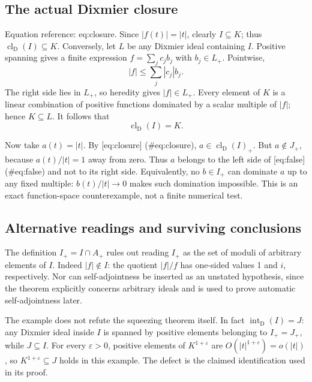 \documentclass[10pt]{article}
\begin{document}
\subsection*{The actual Dixmier closure}
Equation reference: eq:closure. Since \(|f(t)|=|t|\), clearly \(I\subseteq K\); thus \(\operatorname{cl}_{\mathrm D}(I)\subseteq K\). Conversely, let \(L\) be any Dixmier ideal containing \(I\). Positive spanning gives a finite expression \(f=\sum_j c_j b_j\) with \(b_j\in L_+\). Pointwise, \[|f|\leq\sum_j|c_j|b_j.\] The right side lies in \(L_+\), so heredity gives \(|f|\in L_+\). Every element of \(K\) is a linear combination of positive functions dominated by a scalar multiple of \(|f|\); hence \(K\subseteq L\). It follows that \[
 \operatorname{cl}_{\mathrm D}(I)=K.\]\par
Now take \(a(t)=|t|\). By [eq:closure] (\#eq:closure), \(a\in\operatorname{cl}_{\mathrm D}(I)_+\). But \(a\notin J_+\), because \(a(t)/|t|=1\) away from zero. Thus \(a\) belongs to the left side of [eq:false] (\#eq:false) and not to its right side. Equivalently, no \(b\in I_+\) can dominate \(a\) up to any fixed multiple: \(b(t)/|t|\to0\) makes such domination impossible. This is an exact function-space counterexample, not a finite numerical test.\par
\subsection*{Alternative readings and surviving conclusions}
The definition \(I_+=I\cap A_+\) rules out reading \(I_+\) as the set of moduli of arbitrary elements of \(I\). Indeed \(|f|\notin I\): the quotient \(|f|/f\) has one-sided values 1 and \(i\), respectively. Nor can self-adjointness be inserted as an unstated hypothesis, since the theorem explicitly concerns arbitrary ideals and is used to prove automatic self-adjointness later.\par
The example does not refute the squeezing theorem itself. In fact \(\operatorname{int}_{\mathrm D}(I)=J\): any Dixmier ideal inside \(I\) is spanned by positive elements belonging to \(I_+=J_+\), while \(J\subseteq I\). For every \(\varepsilon>0\), positive elements of \(K^{1+\varepsilon}\) are \(O(|t|^{1+\varepsilon})=o(|t|)\), so \(K^{1+\varepsilon}\subseteq J\) holds in this example. The defect is the claimed identification used in its proof.\par
\end{document}
